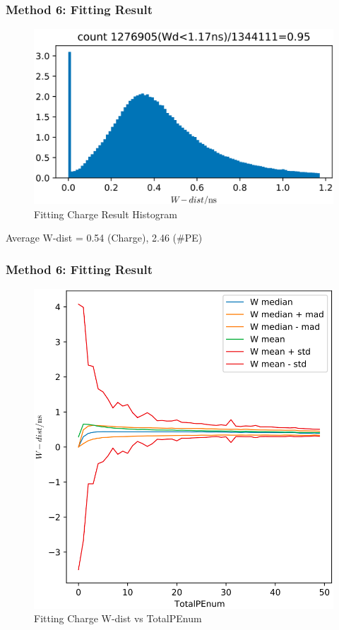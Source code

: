 \documentclass{beamer}
\begin{document}
\begin{frame}
\frametitle{Method 6: Fitting Result}
\begin{figure}
    \centering
    \caption{Fitting Charge Result Histogram}
    \includegraphics[width=0.85\linewidth]{img/xiaopeipchargehist.png}
\end{figure}
\begin{center}
    Average W-dist = 0.54 (Charge), 2.46 (\#PE)
\end{center}
\end{frame}

\begin{frame}
\frametitle{Method 6: Fitting Result}
\setlength{\abovecaptionskip}{0mm}
\setlength{\belowcaptionskip}{0mm}
\begin{figure}
    \centering
    \caption{Fitting Charge W-dist vs TotalPEnum}
    \includegraphics[width=0.65\linewidth]{img/xiaopeipchargestats-1.png}
\end{figure}
\end{frame}
\end{document}
